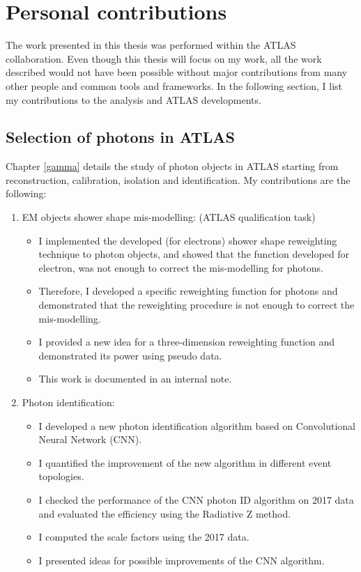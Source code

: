 \chapter*{Personal contributions}
The work presented in this thesis was performed within the ATLAS collaboration. Even though this thesis will focus on my work, all the work described would not have been possible without major contributions from many other people and common tools and frameworks. In the following section, I list my contributions to the analysis and ATLAS  developments.

\section*{Selection of photons in ATLAS}

Chapter \ref{gamma} details the study of photon objects in ATLAS starting from reconstruction, calibration, isolation and identification. My contributions are the following:

\begin{enumerate}
    \item EM objects shower shape mis-modelling: (ATLAS qualification task) 
\begin{itemize}
    \item I implemented the developed (for electrons) shower shape reweighting technique to photon objects, and showed that the function developed for electron, was not enough to correct the mis-modelling for photons. 
    \item Therefore, I developed a specific reweighting function for photons and demonstrated that the reweighting procedure is not enough to correct the mis-modelling. 
    \item I provided a new idea for a three-dimension reweighting function and demonstrated its power using pseudo data.
    \item This work is documented in an internal note.
 
\end{itemize}

\item Photon identification: 
\begin{itemize}
    \item I developed a new photon identification algorithm based on Convolutional Neural Network (CNN).
    \item I quantified the improvement of the new algorithm in different event topologies. 
    \item I checked the performance of the CNN photon ID algorithm on 2017 data and evaluated the efficiency using the Radiative Z method. 
    \item I computed the scale factors using the 2017 data. 
    \item I presented ideas for possible improvements of the CNN algorithm.
\end{itemize}
\end{enumerate}

